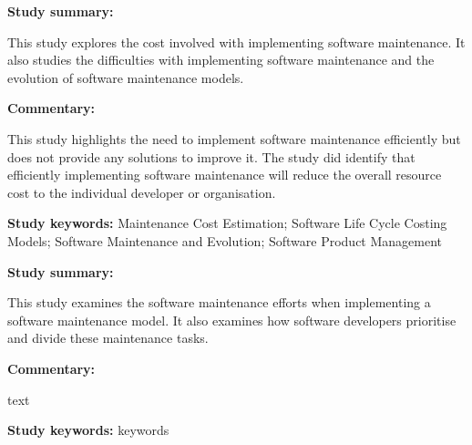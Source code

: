 \begin{tcolorbox}[colback=gray!5!white, colframe=deepblue!80!black, title=A cost model for software maintenance \& evolution\cite{Sneed2004}]
	\begin{minipage}[t]{0.25\textwidth}
		\textbf{Study summary:}
	\end{minipage}
	\hfill
	\begin{minipage}[t]{0.65\textwidth}
		This study explores the cost involved with implementing software maintenance. It also studies the difficulties with implementing software maintenance and the evolution of software maintenance models. 
	\end{minipage}

	\vspace{0.75em} 

	\begin{minipage}[t]{0.25\textwidth}
		\textbf{Commentary:}
	\end{minipage}
	\hfill
	\begin{minipage}[t]{0.65\textwidth}
		This study highlights the need to implement software maintenance efficiently but does not provide any solutions to improve it. The study did identify that efficiently implementing software maintenance will reduce the overall resource cost to the individual developer or organisation.
	\end{minipage}
	\tcblower
	\textbf{Study keywords:} Maintenance Cost Estimation; Software Life Cycle Costing Models; Software Maintenance and Evolution; Software Product Management
\end{tcolorbox}

\clearpage

\begin{tcolorbox}[colback=gray!5!white, colframe=deepblue!80!black, title=Trends in software maintenance tasks distribution among programmers: A study in a micro software company\cite{Stojanov2017}]
	\begin{minipage}[t]{0.25\textwidth}
		\textbf{Study summary:}
	\end{minipage}
	\hfill
	\begin{minipage}[t]{0.65\textwidth}
		This study examines the software maintenance efforts when implementing a software maintenance model. It also examines how software developers prioritise and divide these maintenance tasks.
	\end{minipage}

	\vspace{0.75em} 

	\begin{minipage}[t]{0.25\textwidth}
		\textbf{Commentary:}
	\end{minipage}
	\hfill
	\begin{minipage}[t]{0.65\textwidth}
		text
	\end{minipage}
	\tcblower
	\textbf{Study keywords:} keywords
\end{tcolorbox}

